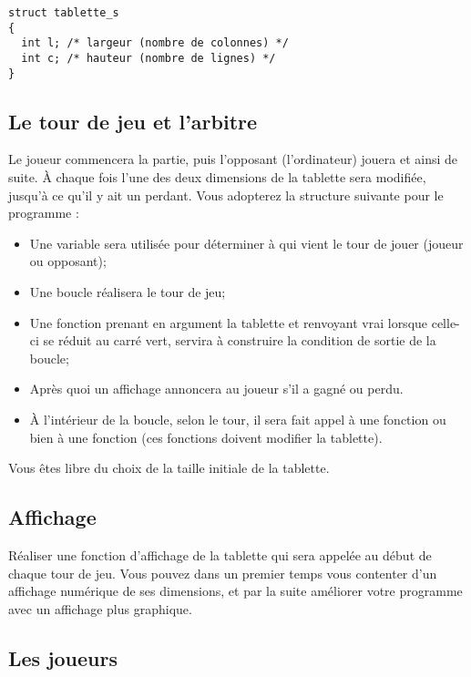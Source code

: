 \begin{correction}
\begin{verbatim}
struct tablette_s 
{
  int l; /* largeur (nombre de colonnes) */
  int c; /* hauteur (nombre de lignes) */
}
\end{verbatim}
\end{correction}

\subsection{Le tour de jeu et l'arbitre}
Le joueur commencera la partie, puis l'opposant (l'ordinateur) jouera
et ainsi de suite. À chaque fois l'une des deux dimensions de la tablette sera
modifiée, jusqu'à ce qu'il y ait un perdant. Vous adopterez la
structure suivante pour le programme :
\begin{itemize}
\item Une variable sera utilisée pour déterminer à qui vient le tour de
  jouer (joueur ou opposant);
\item Une boucle réalisera le tour de jeu;
\item Une fonction  prenant en argument la tablette
  et renvoyant vrai lorsque celle-ci se réduit au carré vert, servira
  à construire la condition de sortie de la boucle;
\item Après quoi un affichage annoncera au joueur s'il a gagné ou
  perdu.
\item À l'intérieur de la boucle, selon le tour, il sera fait appel à
  une fonction  ou bien à une fonction  (ces
  fonctions doivent modifier la tablette).
\end{itemize}

Vous êtes libre du choix de la taille initiale de la tablette.

\subsection{Affichage}

Réaliser une fonction d'affichage de la tablette qui sera appelée au
début de chaque tour de jeu. Vous pouvez dans un premier temps vous
contenter d'un affichage numérique de ses dimensions, et par la suite
améliorer votre programme avec un affichage plus graphique.

\subsection{Les joueurs}

